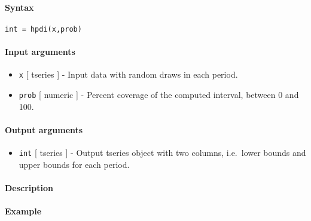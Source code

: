 


	\paragraph{Syntax}\label{syntax}

\begin{verbatim}
int = hpdi(x,prob)
\end{verbatim}

\paragraph{Input arguments}\label{input-arguments}

\begin{itemize}
\item
  \texttt{x} {[} tseries {]} - Input data with random draws in each
  period.
\item
  \texttt{prob} {[} numeric {]} - Percent coverage of the computed
  interval, between 0 and 100.
\end{itemize}

\paragraph{Output arguments}\label{output-arguments}

\begin{itemize}
\itemsep1pt\parskip0pt
\item
  \texttt{int} {[} tseries {]} - Output tseries object with two columns,
  i.e.~lower bounds and upper bounds for each period.
\end{itemize}

\paragraph{Description}\label{description}

\paragraph{Example}\label{example}


